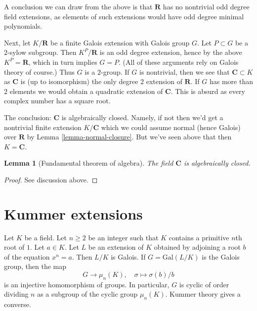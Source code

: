 \documentclass{stacks-project}
\theoremstyle{plain}
\newtheorem{lemma}[subsection]{Lemma}
\theoremstyle{definition}
\theoremstyle{remark}
\numberwithin{equation}{subsection}
\begin{document}
\medskip\noindent
A conclusion we can draw from the above is that $\mathbf{R}$ has
no nontrivial odd degree field extensions, as elements of such extensions
would have odd degree minimal polynomials.

\medskip\noindent
Next, let $K/\mathbf{R}$ be a finite Galois extension with Galois group $G$.
Let $P \subset G$ be a $2$-sylow subgroup. Then $K^P/\mathbf{R}$ is an
odd degree extension, hence by the above $K^P = \mathbf{R}$,
which in turn implies
$G = P$. (All of these arguments rely on Galois theory of course.)
Thus $G$ is a $2$-group. If $G$ is nontrivial, then we see that
$\mathbf{C} \subset K$ as $\mathbf{C}$ is (up to isomorphism) the only
degree $2$ extension of $\mathbf{R}$. If $G$ has more than $2$ elements
we would obtain a quadratic extension of $\mathbf{C}$.
This is absurd as every complex number has a square root.

\medskip\noindent
The conclusion: $\mathbf{C}$ is algebraically closed. Namely, if not
then we'd get a nontrivial finite extension $K/\mathbf{C}$
which we could assume normal (hence Galois) over $\mathbf{R}$ by
Lemma \ref{lemma-normal-closure}. But we've seen above that then
$K = \mathbf{C}$.

\begin{lemma}[Fundamental theorem of algebra]
\label{lemma-C-algebraically-closed}
The field $\mathbf{C}$ is algebraically closed.
\end{lemma}

\begin{proof}
See discussion above.
\end{proof}





\section{Kummer extensions}
\label{section-Kummer}

\noindent
Let $K$ be a field. Let $n \geq 2$ be an integer such that $K$ contains
a primitive $n$th root of $1$. Let $a \in K$. Let $L$ be an extension
of $K$ obtained by adjoining a root $b$ of the equation $x^n = a$.
Then $L/K$ is Galois. If $G = \text{Gal}(L/K)$ is the Galois group, then
the map
$$
G \longrightarrow \mu_n(K),\quad \sigma \longmapsto \sigma(b)/b
$$
is an injective homomorphism of groups. In particular, $G$ is cyclic
of order dividing $n$ as a subgroup of the cyclic group $\mu_n(K)$.
Kummer theory gives a converse.
\end{document}
